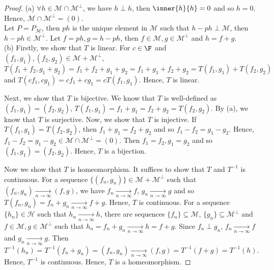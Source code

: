 \begin{proof}
    (a) $\forall h\in \mathscr{M}\cap \mathscr{M}^{\perp}$, we have $h\perp h$, then $\inner{h}{h}=0$ and so $h=0$.
    Hence, $\mathscr{M}\cap \mathscr{M}^{\perp}=(0)$.\\
    Let $P=P_{\mathscr{M}}$, then $ph$ is the unique element in $\mathscr{M}$ such that $h-ph\perp \mathscr{M}$, then $h-ph\in \mathscr{M}^{\perp}$.
    Let $f=ph,g=h-ph$, then $f\in \mathscr{M},g\in\mathscr{M}^{\perp}$ and $h=f+g$.
    \\
    (b) 
    Firstly, we show that $T$ is linear. For $c\in\F$ and $(f_1,g_1),(f_2,g_2)\in \mathscr{M}+\mathscr{M}^{\perp}$,
    $T(f_1+f_2,g_1+g_2)=f_1+f_2+g_1+g_2=f_1+g_1+f_2+g_2=T(f_1,g_1)+T(f_2,g_2)$ and $T(cf_1,cg_1)=cf_1+cg_1=cT(f_1,g_1)$.
    Hence, $T$ is linear.
    \par
    Next, we show that $T$ is bijective.
    We know that $T$ is well-defined as $(f_1,g_1)=(f_2,g_2)$, $T(f_1,g_1)=f_1+g_1=f_2+g_2=T(f_2,g_2)$.
    By (a), we know that $T$ is surjective. Now, we show that $T$ is injective.  
    If $T(f_1,g_1)=T(f_2,g_2)$, then $f_1+g_1=f_2+g_2$ and so $f_1-f_2=g_1-g_2$.
    Hence, $f_1-f_2=g_1-g_2\in \mathscr{M}\cap \mathscr{M}^{\perp}=(0)$. 
    Then $f_1=f_2,g_1=g_2$ and so $(f_1,g_1)=(f_2,g_2)$. 
    Hence, $T$ is a bijection.
    \par
    Now we show that $T$ is homeomorphism. It suffices to show that $T$ and $T^{-1}$ is continuous.
    For a sequence $\{(f_n,g_n)\}\in \mathscr{M}+\mathscr{M}^{\perp}$ such that $(f_n,g_n)\underset{n\rightarrow \infty}{\longrightarrow} (f,g)$, 
    we have $f_n\underset{n\rightarrow \infty}{\longrightarrow} f$, $g_n\underset{n\rightarrow \infty}{\longrightarrow}g$ and so $T(f_n,g_n)=f_n+g_n\underset{n\rightarrow \infty}{\longrightarrow} f+g$. Hence, $T$ is continuous.
    For a sequence $\{h_n\}\in \mathscr{H}$ such that $h_n\underset{n\rightarrow \infty}{\longrightarrow} h$, 
    there are sequences $\{f_n\}\subseteq \mathscr{M}$, $\{g_n\}\subseteq \mathscr{M}^{\perp}$ and $f\in\mathscr{M},g\in\mathscr{M}^{\perp}$ 
    such that $h_n=f_n+g_n\underset{n\rightarrow \infty}{\longrightarrow} h=f+g$. 
    Since $f_n\perp g_n$, $f_n\underset{n\rightarrow \infty}{\longrightarrow} f$ and $g_n\underset{n\rightarrow \infty}{\longrightarrow} g$.
    Then $T^{-1}(h_n)=T^{-1}(f_n+g_n)=(f_n,g_n)\underset{n\rightarrow \infty}{\longrightarrow} (f,g)=T^{-1}(f+g)=T^{-1}(h)$.
    Hence, $T^{-1}$ is continuous.
    Hence, $T$ is a homeomorphism.
\end{proof}

